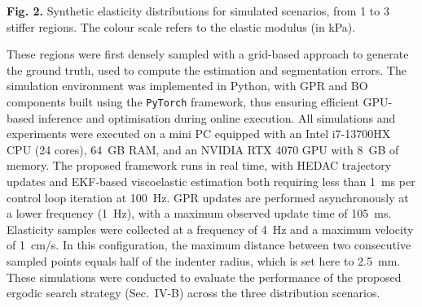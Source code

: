 \documentclass[11pt]{article}
\begin{document}
\vspace{0.3em}

\begin{center}
\textbf{Fig. 2.} Synthetic elasticity distributions for simulated
scenarios, from 1 to 3 stiffer regions. The colour scale refers to
the elastic modulus (in kPa).
\end{center}

\vspace{0.8em}

\noindent
These regions were first densely sampled with a grid-based approach
to generate the ground truth, used to compute the estimation and
segmentation errors. The simulation environment was implemented in
Python, with GPR and BO components built using the \texttt{PyTorch}
framework, thus ensuring efficient GPU-based inference and
optimisation during online execution. All simulations and
experiments were executed on a mini PC equipped with an Intel
i7-13700HX CPU (24 cores), 64~GB RAM, and an NVIDIA RTX 4070 GPU
with 8~GB of memory. The proposed framework runs in real time, with
HEDAC trajectory updates and EKF-based viscoelastic estimation both
requiring less than 1~ms per control loop iteration at 100~Hz. GPR
updates are performed asynchronously at a lower frequency (1~Hz),
with a maximum observed update time of 105~ms. Elasticity samples
were collected at a frequency of 4~Hz and a maximum velocity of
1~cm/s. In this configuration, the maximum distance between two
consecutive sampled points equals half of the indenter radius, which
is set here to 2.5~mm. These simulations were conducted to evaluate
the performance of the proposed ergodic search strategy
(Sec.~IV-B) across the three distribution scenarios.

\vspace{0.4em}
\end{document}
